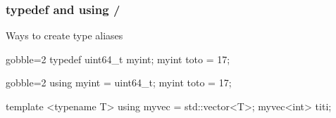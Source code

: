 \begin{frame}[fragile]
  \frametitle{typedef and using \hfill {} / }
  Ways to create type aliases
  \begin{alertblock}{}
    \begin{cppcode*}{gobble=2}
      typedef uint64_t myint;
      myint toto = 17;
    \end{cppcode*}
  \end{alertblock}
  \begin{exampleblock}{}
    \begin{cppcode*}{gobble=2}
      using myint = uint64_t;
      myint toto = 17;

      template <typename T> using myvec = std::vector<T>;
      myvec<int> titi;
    \end{cppcode*}
  \end{exampleblock}
\end{frame}
